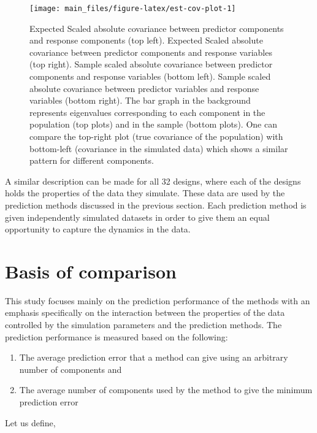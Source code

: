 \documentclass[review]{elsarticle}
\providecommand{\tightlist}{%
  \setlength{\itemsep}{0pt}\setlength{\parskip}{0pt}}
\begin{document}
\begin{figure}
\texttt{[image: main\_files/figure-latex/est-cov-plot-1]} \caption{Expected Scaled absolute covariance between predictor components and response components (top left). Expected Scaled absolute covariance between predictor components and response variables (top right). Sample scaled absolute covariance between predictor components and response variables (bottom left). Sample scaled absolute covariance between predictor variables and response variables (bottom right). The bar graph in the background represents eigenvalues corresponding to each component in the population (top plots) and in the sample (bottom plots). One can compare the top-right plot (true covariance of the population) with bottom-left (covariance in the simulated data) which shows a similar pattern for different components.}\label{fig:est-cov-plot}
\end{figure}

A similar description can be made for all 32 designs, where each of the designs holds the properties of the data they simulate. These data are used by the prediction methods discussed in the previous section. Each prediction method is given independently simulated datasets in order to give them an equal opportunity to capture the dynamics in the data.

\hypertarget{basis-of-comparison}{%
\section{Basis of comparison}\label{basis-of-comparison}}

This study focuses mainly on the prediction performance of the methods with an emphasis specifically on the interaction between the properties of the data controlled by the simulation parameters and the prediction methods. The prediction performance is measured based on the following:

\begin{enumerate}
\def\labelenumi{\alph{enumi})}
\tightlist
\item
  The average prediction error that a method can give using an arbitrary number of components and
\item
  The average number of components used by the method to give the minimum prediction error
\end{enumerate}

Let us define,
\end{document}

